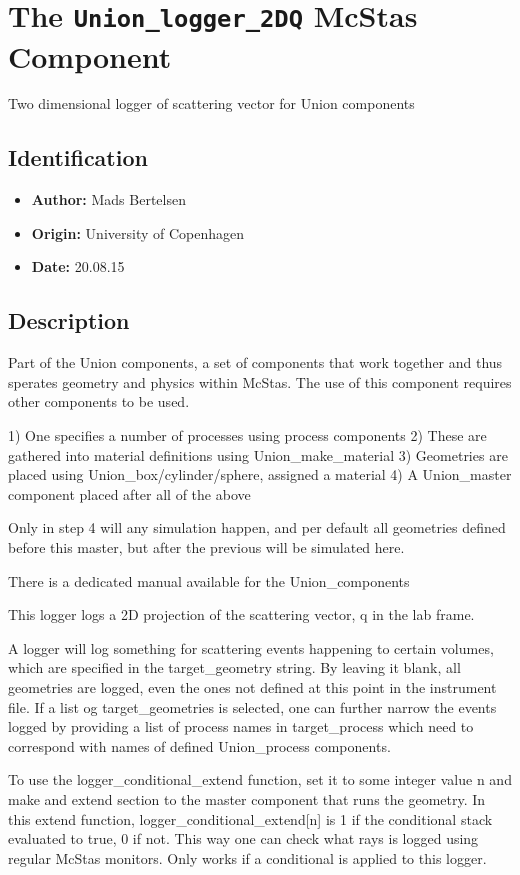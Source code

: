 \section{The \texttt{Union\_logger\_2DQ} McStas Component}
Two dimensional logger of scattering vector for Union components

\subsection*{Identification}
\begin{itemize}
  \item \textbf{Author:} Mads Bertelsen
  \item \textbf{Origin:} University of Copenhagen
  \item \textbf{Date:} 20.08.15
\end{itemize}

\subsection*{Description}
Part of the Union components, a set of components that work together and thus sperates geometry and physics within McStas. The use of this component requires other components to be used.

1) One specifies a number of processes using process components 2) These are gathered into material definitions using Union\_make\_material 3) Geometries are placed using Union\_box/cylinder/sphere, assigned a material 4) A Union\_master component placed after all of the above

Only in step 4 will any simulation happen, and per default all geometries defined before this master, but after the previous will be simulated here.

There is a dedicated manual available for the Union\_components

This logger logs a 2D projection of the scattering vector, q in the lab frame.

A logger will log something for scattering events happening to certain volumes, which are specified in the target\_geometry string. By leaving it blank, all geometries are logged, even the ones not defined at this point in the instrument file. If a list og target\_geometries is selected, one can further narrow the events logged by providing a list of process names in target\_process which need to correspond with names of defined Union\_process components.

To use the logger\_conditional\_extend function, set it to some integer value n and make and extend section to the master component that runs the geometry. In this extend function, logger\_conditional\_extend[n] is 1 if the conditional stack evaluated to true, 0 if not. This way one can check what rays is logged using regular McStas monitors. Only works if a conditional is applied to this logger.

